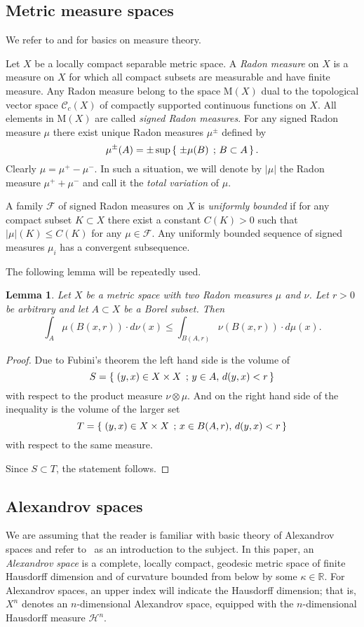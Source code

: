 \documentclass[12pt,leqno,intlimits]{amsart}
\numberwithin{equation}{section}
\newtheorem{lem}[thm]{Lemma}
\theoremstyle{definition}
\theoremstyle{remark}
\newcommand{\R}{\mathbb{R}}
\newcommand*{\set}[2]{\left\{\,\left.{#1}\vphantom{#2}\,\right.;\,{#2}\,\right\}}
\begin{document}
\subsection{Metric measure spaces}
We refer to \cite{Federer} and \cite{Evans} for basics on measure theory.

Let $X$ be a locally compact separable metric space.
A \emph{Radon measure} on $X$ is a measure on $X$ for which all compact subsets are measurable and have finite measure.
Any Radon measure belong to the space $\mathrm M(X)$ dual to the topological vector space $\mathcal C_c (X)$ of compactly supported continuous functions on $X$.
All elements in $\mathrm M(X)$ are called \emph{signed Radon measures}.
{\color{red}
For any signed Radon measure $\mu$ there exist unique Radon measures $\mu^{\pm}$ defined by
\[\mu^\pm(A)=\pm\sup\set{\pm\mu(B)}{B\subset A}.\]
Clearly $\mu =\mu ^+- \mu ^-$.
}
In such a situation, we will denote by $|\mu |$ the Radon measure $\mu ^+ +\mu ^-$ and call it the \emph{total variation} of $\mu$.


A family $\mathcal F$ of signed Radon measures on $X$ is \emph{uniformly bounded} if for any compact subset $K\subset X$ there exist a constant $C(K)>0$ such that $|\mu| (K) \leq C(K)$ for any $\mu \in \mathcal F$.
Any uniformly bounded sequence of signed measures $\mu _i$ has a convergent subsequence.

The following lemma will be repeatedly used.

\begin{lem} \label{lem:exchange}
Let $X$ be a metric space with two Radon measures $\mu $ and $\nu$. Let $r>0$ be arbitrary and let $A\subset X$ be a Borel subset. Then
$$\int _A \mu (B(x,r)) \cdot d\nu (x) \leq \int _{B (A,r)} \nu (B (x,r)) \cdot d\mu (x).$$
\end{lem}

\begin{proof} Due to Fubini's theorem
the left hand side is the volume of
$$S=\set{(y,x) \in X\times X}{y \in A,\, d(y,x) <r}$$
with respect to the product measure $\nu \otimes \mu$. %
And on the right hand side of the inequality is the volume of the larger set
$$T=\set{(y,x) \in X\times X}{x\in B(A,r), \, d(y,x)<r}$$
with respect to the same measure.

Since $S\subset T$, the statement follows.
\end{proof}

\subsection{Alexandrov spaces} \label{subsec:Alex}
We are assuming that the reader is familiar with basic theory of Alexandrov spaces and refer to~\cite{BGP} as an introduction to the subject.
In this paper, an \emph{Alexandrov space} is a complete, locally compact, geodesic metric space of finite Hausdorff dimension and of curvature bounded from below by some $\kappa \in \R$.
For Alexandrov spaces, an upper index will indicate the Hausdorff dimension; that is, $X^n$ denotes an $n$-dimensional Alexandrov space, equipped with the $n$-dimensional Hausdorff measure $\mathcal H^n$.
\end{document}
